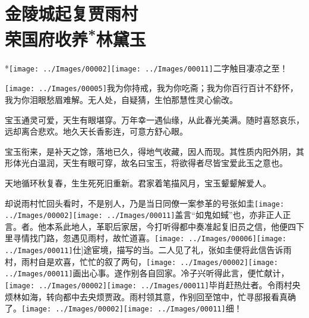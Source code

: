 

\chapter{金陵城起复贾雨村\\荣国府收养\textsuperscript{*}林黛玉}

*{\texttt{[image: ../Images/00002]}\texttt{[image: ../Images/00011]}\footnotesize \kaishu 二字触目凄凉之至！}

{\texttt{[image: ../Images/00005]}\kaishu  我为你持戒，我为你吃斋；我为你百行百计不舒怀，我为你泪眼愁眉难解。无人处，自疑猜，生怕那慧性灵心偷改。}

{\kaishu 宝玉通灵可爱，天生有眼堪穿。万年幸一遇仙缘，从此春光美满。随时喜怒哀乐，远却离合悲欢。地久天长香影连，可意方舒心眼。}

{\kaishu 宝玉衔来，是补天之馀，落地已久，得地气收藏，因人而现。其性质内阳外阴，其形体光白温润，天生有眼可穿，故名曰宝玉，将欲得者尽皆宝爱此玉之意也。}

{\kaishu 天地循环秋复春，生生死死旧重新。君家着笔描风月，宝玉颦颦解爱人。}

却说雨村忙回头看时，不是别人，乃是当日同僚一案参革的号张如圭{\texttt{[image: ../Images/00002]}\texttt{[image: ../Images/00011]}\footnotesize \kaishu 盖言``如鬼如蜮''也，亦非正人正言。}者。他本系此地人，革职后家居，今打听得都中奏准起复旧员之信，他便四下里寻情找门路，忽遇见雨村，故忙道喜。{\texttt{[image: ../Images/00006]}\texttt{[image: ../Images/00011]}\footnotesize \kaishu {(此)}{[}仕{]}途宦境，描写的当。}二人见了礼，张如圭便将此信告诉雨村，雨村自是欢喜，忙忙的叙了两句，{\texttt{[image: ../Images/00002]}\texttt{[image: ../Images/00011]}\footnotesize \kaishu 画出心事。}遂作别各自回家。冷子兴听得此言，便忙献计，{\texttt{[image: ../Images/00002]}\texttt{[image: ../Images/00011]}\footnotesize \kaishu 毕肖赶热灶者。}令雨村央烦林如海，转向都中去央烦贾政。雨村领其意，作别回至馆中，忙寻邸报看真确了。{\texttt{[image: ../Images/00002]}\texttt{[image: ../Images/00011]}\footnotesize \kaishu 细！}

